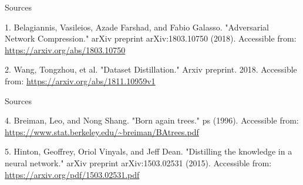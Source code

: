\documentclass{beamer}
\begin{document}
\begin{frame}{Sources}

\begin{thebibliography}{0}

   1. Belagiannis, Vasileios, Azade Farshad, and Fabio Galasso. "Adversarial Network Compression." arXiv preprint arXiv:1803.10750 (2018). Accessible from: \url{https://arxiv.org/abs/1803.10750}
  
   2. Wang, Tongzhou, et al. "Dataset Distillation." Arxiv preprint. 2018. Accessible from: \url{https://arxiv.org/abs/1811.10959v1}
  
  
\end{thebibliography}

\end{frame}


\begin{frame}{Sources}

\begin{thebibliography}{0}
   4. Breiman, Leo, and Nong Shang. "Born again trees." ps (1996). Accessible from: \url{https://www.stat.berkeley.edu/~breiman/BAtrees.pdf}
  
   5. Hinton, Geoffrey, Oriol Vinyals, and Jeff Dean. "Distilling the knowledge in a neural network." arXiv preprint arXiv:1503.02531 (2015). Accessible from: \url{https://arxiv.org/pdf/1503.02531.pdf}
  

\end{thebibliography}

\end{frame}
 
 
 
\end{document}
